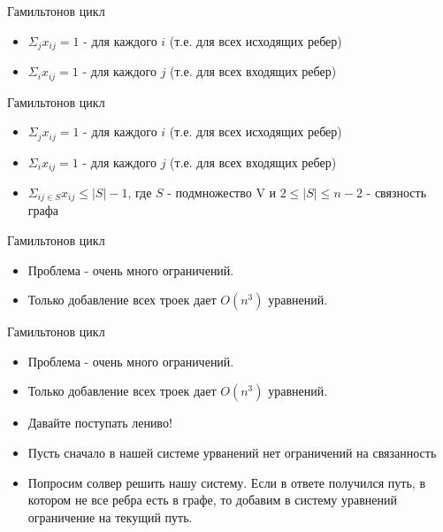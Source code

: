 \documentclass{beamer}
\begin{document}
\begin{frame}{Гамильтонов цикл}
\begin{itemize}
\item $\Sigma_{j} x_{ij} = 1$ - для каждого $i$ (т.е. для всех исходящих ребер)
\item $\Sigma_{i} x_{ij} = 1$ - для каждого $j$ (т.е. для всех входящих ребер)
\end{itemize}
\end{frame}

\begin{frame}{Гамильтонов цикл}
\begin{itemize}
\item $\Sigma_{j} x_{ij} = 1$ - для каждого $i$ (т.е. для всех исходящих ребер)
\item $\Sigma_{i} x_{ij} = 1$ - для каждого $j$ (т.е. для всех входящих ребер)
\item $\Sigma_{ij \in S} x_{ij} \le |S| - 1$, где $S$ - подмножество V и $2 \le |S| \le n - 2$ - связность графа
\end{itemize}
\end{frame}

\begin{frame}{Гамильтонов цикл}
\begin{itemize}
\item Проблема - очень много ограничений.
\item Только добавление всех троек дает $O(n^3)$ уравнений.
\end{itemize}
\end{frame}

\begin{frame}{Гамильтонов цикл}
\begin{itemize}
\item Проблема - очень много ограничений.
\item Только добавление всех троек дает $O(n^3)$ уравнений.
\item Давайте поступать лениво!
\item Пусть сначало в нашей системе урванений нет ограничений на связанность
\item Попросим солвер решить нашу систему. Если в ответе получился путь, в котором не все ребра есть в графе, то добавим в
систему уравнений ограничение на текущий путь.
\end{itemize}
\end{frame}
\end{document}
